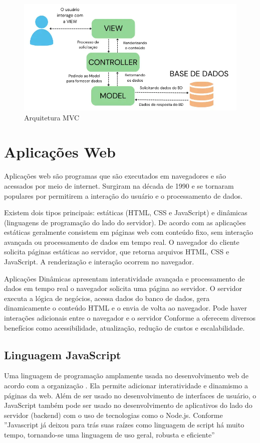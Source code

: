 \begin{figure}[htb]
    \caption{\label{fig:grafico-mvc}Arquitetura MVC}
    \begin{center}
        \includegraphics[scale=0.7]{imagens/arquitetura-mvc.png}
    \end{center}
\end{figure}


\section{Aplicações Web}
Aplicações web são programas que são executados em navegadores e são acessados por meio de internet.
Surgiram na década de 1990 e se tornaram populares por permitirem a interação do usuário e o processamento de dados.

Existem dois tipos principais: estáticas (HTML, CSS e JavaScript) e dinâmicas (linguagens de programação do lado do servidor).
De acordo com\cite{aplicacoesWeb} as aplicações estáticas geralmente consistem em páginas web com conteúdo fixo, sem interação avançada ou processamento de dados em tempo real. O navegador do cliente solicita páginas estáticas ao servidor, que retorna arquivos HTML, CSS e JavaScript. A renderização e interação ocorrem no navegador.

Aplicações Dinâmicas apresentam interatividade avançada e processamento de dados em tempo real o navegador solicita uma página ao servidor. O servidor executa a lógica de negócios, acessa dados do banco de dados, gera dinamicamente o conteúdo HTML e o envia de volta ao navegador. Pode haver interações adicionais entre o navegador e o servidor \cite{aplicacoesWeb}
Conforme a \cite{amazonAplicaoWeb} oferecem diversos benefícios como acessibilidade, atualização, redução de custos e escalabilidade.

\subsection{Linguagem JavaScript}
Uma linguagem de programação amplamente usada no desenvolvimento web de acordo com a organização \cite{mozillaJavaScript}. Ela permite adicionar interatividade e dinamismo a páginas da web. Além de ser usado no desenvolvimento de interfaces de usuário, o JavaScript também pode ser usado no desenvolvimento de aplicativos do lado do servidor (backend) com o uso de tecnologias como o Node.js. Conforme \cite{flanagan2012javascript} ''Javascript já deixou para trás suas raízes como linguagem de script há muito tempo, tornando-se uma linguagem de uso geral, robusta e eficiente''

